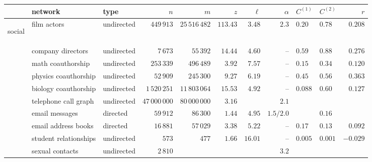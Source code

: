 
\begin{table}[!hbt]
\centering

\resizebox{15cm}{!} {\begin{minipage}{\textwidth}

\begin{tabular}{l|l|l|r|r|r|r|r|l|l|r|}
 & network                   & type       & $n$             & $m$                & $z$     & $\ell$  & $\alpha$
 & $C^{(1)}$ & $C^{(2)}$ & $r$ \\
\hline
\begin{rotate}{90}
\hbox{\hspace{-7.1em}social}
\end{rotate}
 & film actors               & undirected & $449\,913$      & $25\,516\,482$     & $113.43$& $3.48$  & $2.3$
 & $0.20$  & $0.78$  & $0.208$  \\
 & company directors         & undirected & $7\,673$        & $55\,392$          & $14.44$ & $4.60$  & --
 & $0.59$  & $0.88$  & $0.276$  \\
 & math coauthorship         & undirected & $253\,339$      & $496\,489$         & $3.92$  & $7.57$  & --
 & $0.15$  & $0.34$  & $0.120$  \\
 & physics coauthorship      & undirected & $52\,909$       & $245\,300$         & $9.27$  & $6.19$  & --
 & $0.45$  & $0.56$  & $0.363$  \\
 & biology coauthorship      & undirected & $1\,520\,251$   & $11\,803\,064$     & $15.53$ & $4.92$  & --
 & $0.088$ & $0.60$  & $0.127$  \\
 & telephone call graph      & undirected & $47\,000\,000$  & $80\,000\,000$     & $3.16$  &         & $2.1$
 &         &      &          \\
 & email messages            & directed   & $59\,912$       & $86\,300$          & $1.44$  & $4.95$  & $1.5/2.0$
 &         & $0.16$  &          \\
 & email address books       & directed   & $16\,881$       & $57\,029$          & $3.38$  & $5.22$  & --
 & $0.17$  & $0.13$  & $0.092$  \\
 & student relationships     & undirected & $573$           & $477$              & $1.66$  & $16.01$ & --
 & $0.005$ & $0.001$ & $-0.029$ \\
 & sexual contacts           & undirected & $2\,810$        &                    &         &         & $3.2$

\end{tabular}
\end{minipage}}
\end{table}
